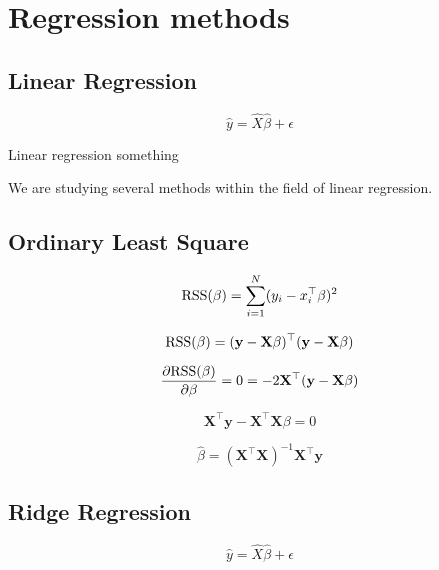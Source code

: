 \documentclass[a4paper,12pt, english]{article}
\begin{document}
\section*{Regression methods}

\subsection*{Linear Regression}

\begin{equation}
\hat{y} = \hat{X} \hat{\beta} + \epsilon
\end{equation}


Linear regression something

We are studying several methods within the field of linear regression.

\subsection*{Ordinary Least Square}

\begin{equation}
\textnormal{RSS}(\beta) = \sum_{i=1}^{N} (y_i - x_i^{\top}\beta)^2
\end{equation}

\begin{equation}
\textnormal{RSS}(\beta) = (\mathbf{y} - \mathbf{X}\beta)^{\top}(\mathbf{y} - \mathbf{X}\beta)
\end{equation}

\begin{equation}
\frac{\partial \textnormal{RSS}(\beta)}{\partial \beta} = 0 = -2 \mathbf{X}^{\top}(\mathbf{y} - \mathbf{X}\beta)
\end{equation}

\begin{equation}
\mathbf{X}^{\top}\mathbf{y} - \mathbf{X}^{\top}\mathbf{X} \beta = 0
\end{equation}

\begin{equation}
\hat{\beta} = (\mathbf{X}^{\top}\mathbf{X})^{-1}\mathbf{X}^{\top}\mathbf{y}
\end{equation}

\subsection*{Ridge Regression}

\begin{equation}
\hat{y} = \hat{X} \hat{\beta} + \epsilon
\end{equation}
\end{document}
